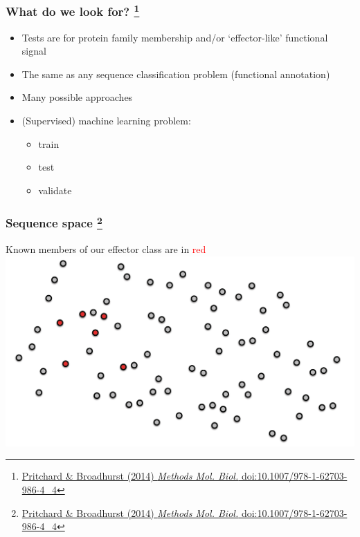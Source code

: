 \begin{frame}
  \frametitle{What do we look for?
  \footnote{\tiny{\href{http://dx.doi.org/10.1007/978-1-62703-986-4_4}{Pritchard \& Broadhurst (2014) \textit{Methods Mol. Biol.} doi:10.1007/978-1-62703-986-4\_4}}}
  }
      \begin{itemize}  
        \item \textcolor{hutton_green}{Tests are for protein family membership and/or `effector-like' functional signal}
        \item \textcolor{hutton_blue}{The same as any sequence classification problem (functional annotation)}
        \item \textcolor{hutton_purple}{Many possible approaches}
        \item \textcolor{RawSienna}{(Supervised) machine learning problem:}
        \begin{itemize}
          \item train
          \item test
          \item validate
        \end{itemize}
      \end{itemize}
\end{frame}

\begin{frame}
  \frametitle{Sequence space
  \footnote{\tiny{\href{http://dx.doi.org/10.1007/978-1-62703-986-4_4}{Pritchard \& Broadhurst (2014) \textit{Methods Mol. Biol.} doi:10.1007/978-1-62703-986-4\_4}}}
}
  Known members of our effector class are in \textcolor{red}{red} \vspace{0.5cm}
  \includegraphics[width=1\textwidth,valign=b]{images/finding_effectors1}    
\end{frame}

